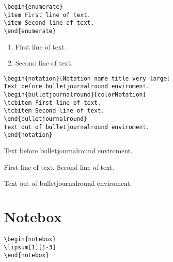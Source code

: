 \lipsum[1][1-3]

\begin{verbatim}
\begin{enumerate}
\item First line of text.
\item Second line of text.
\end{enumerate}
\end{verbatim}
\begin{enumerate}
\item First line of text.
\item Second line of text.
\end{enumerate}

\lipsum[1][1-3]

\begin{verbatim}
\begin{notation}[Notation name title very large]
Text before bulletjournalround enviroment.
\begin{bulletjournalround}[colorNotation]
\tcbitem First line of text.
\tcbitem Second line of text.
\end{bulletjournalround}
Text out of bulletjournalround enviroment.
\end{notation}
\end{verbatim}
\begin{notation}
Text before bulletjournalround enviroment.
\begin{bulletjournalround}[colorNotation]
\tcbitem First line of text.
\tcbitem Second line of text.
\end{bulletjournalround}
Text out of bulletjournalround enviroment.
\end{notation}


\section{Notebox}

\begin{verbatim}
\begin{notebox}
\lipsum[1][1-3]
\end{notebox}
\end{verbatim}
\begin{notebox}
\lipsum[1][1-3]
\end{notebox}


